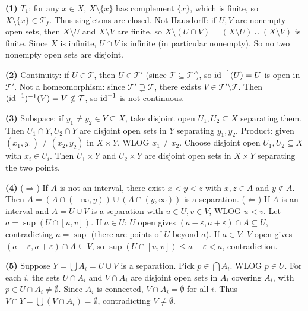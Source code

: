 \documentclass{report}
\begin{document}
\begin{solution}
\textbf{(1)} \(T_1\): for any \(x \in X\), \(X \setminus \{x\}\) has complement \(\{x\}\), which is finite, so \(X \setminus \{x\} \in \mathcal{T}_f\). Thus singletons are closed. Not Hausdorff: if \(U, V\) are nonempty open sets, then \(X \setminus U\) and \(X \setminus V\) are finite, so \(X \setminus (U \cap V) = (X \setminus U) \cup (X \setminus V)\) is finite. Since \(X\) is infinite, \(U \cap V\) is infinite (in particular nonempty). So no two nonempty open sets are disjoint.

\textbf{(2)} Continuity: if \(U \in \mathcal{T}\), then \(U \in \mathcal{T}'\) (since \(\mathcal{T} \subseteq \mathcal{T}'\)), so \(\text{id}^{-1}(U) = U\) is open in \(\mathcal{T}'\). Not a homeomorphism: since \(\mathcal{T}' \supsetneq \mathcal{T}\), there exists \(V \in \mathcal{T}' \setminus \mathcal{T}\). Then \((\text{id}^{-1})^{-1}(V) = V \notin \mathcal{T}\), so \(\text{id}^{-1}\) is not continuous.

\textbf{(3)} Subspace: if \(y_1 \neq y_2 \in Y \subseteq X\), take disjoint open \(U_1, U_2 \subseteq X\) separating them. Then \(U_1 \cap Y, U_2 \cap Y\) are disjoint open sets in \(Y\) separating \(y_1, y_2\). Product: given \((x_1, y_1) \neq (x_2, y_2)\) in \(X \times Y\), WLOG \(x_1 \neq x_2\). Choose disjoint open \(U_1, U_2 \subseteq X\) with \(x_i \in U_i\). Then \(U_1 \times Y\) and \(U_2 \times Y\) are disjoint open sets in \(X \times Y\) separating the two points.

\textbf{(4)} (\(\Rightarrow\)) If \(A\) is not an interval, there exist \(x < y < z\) with \(x, z \in A\) and \(y \notin A\). Then \(A = (A \cap (-\infty, y)) \cup (A \cap (y, \infty))\) is a separation. (\(\Leftarrow\)) If \(A\) is an interval and \(A = U \cup V\) is a separation with \(u \in U, v \in V\), WLOG \(u < v\). Let \(a = \sup(U \cap [u, v])\). If \(a \in U\): \(U\) open gives \((a - \varepsilon, a + \varepsilon) \cap A \subseteq U\), contradicting \(a = \sup\) (there are points of \(U\) beyond \(a\)). If \(a \in V\): \(V\) open gives \((a - \varepsilon, a + \varepsilon) \cap A \subseteq V\), so \(\sup(U \cap [u, v]) \leq a - \varepsilon < a\), contradiction.

\textbf{(5)} Suppose \(Y = \bigcup A_i = U \cup V\) is a separation. Pick \(p \in \bigcap A_i\). WLOG \(p \in U\). For each \(i\), the sets \(U \cap A_i\) and \(V \cap A_i\) are disjoint open sets in \(A_i\) covering \(A_i\), with \(p \in U \cap A_i \neq \emptyset\). Since \(A_i\) is connected, \(V \cap A_i = \emptyset\) for all \(i\). Thus \(V \cap Y = \bigcup (V \cap A_i) = \emptyset\), contradicting \(V \neq \emptyset\).


\end{solution}
\end{document}
